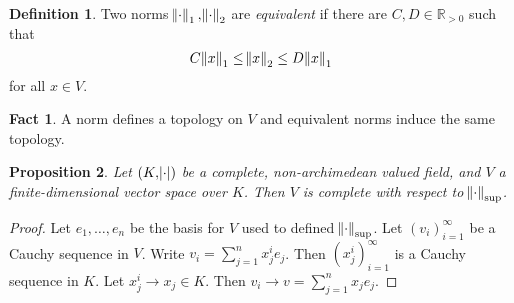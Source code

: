 \documentclass[11pt]{article}
\theoremstyle{definition}
\newtheorem{definition}{Definition}[subsection]
\newtheorem*{fact}{Fact}
\theoremstyle{plain}
\newtheorem{proposition}[definition]{Proposition}
\theoremstyle{remark}
\newcommand{\RR}{\mathbb{R}}
\begin{document}
\begin{definition}\label{def:6_3}
    Two norms $\norm{\cdot}_1, \norm{\cdot}_2$ are \emph{equivalent} if there are $C, D \in \RR_{>0}$ such that
    \begin{equation*}
        C \norm{x}_1 \le \norm{x}_2 \le D \norm{x}_1
    \end{equation*}
    for all $x \in V$.
\end{definition}
\begin{fact}
    A norm defines a topology on $V$ and equivalent norms induce the same topology.
\end{fact}

\begin{proposition}\label{prop:6_4}
    Let $(K, \abs{\cdot})$ be a complete, non-archimedean valued field, and $V$ a finite-dimensional vector space over $K$. Then $V$ is complete with respect to $\norm{\cdot}_\mathrm{sup}$.
\end{proposition}
\begin{proof}
    Let $e_1, \ldots, e_n$ be the basis for $V$ used to defined $\norm{\cdot}_\mathrm{sup}$. Let $(v_i)_{i=1}^\infty$ be a Cauchy sequence in $V$. Write $v_i = \sum_{j=1}^n x_j^i e_j$. Then $(x_j^i)_{i=1}^\infty$ is a Cauchy sequence in $K$. Let $x_j^i \to x_j \in K$. Then $v_i \to v = \sum_{j=1}^n x_j e_j$.
\end{proof}
\end{document}
